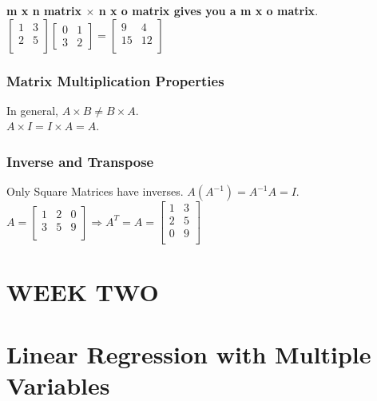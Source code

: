 \documentclass[11pt,a4paper]{article}
\begin{document}
{\bf m x n matrix $\times$ n x o matrix gives you a m x o matrix}.
$ \begin{bmatrix}
 1 & 3 \\ 
2 & 5\\ 
\end{bmatrix} \begin{bmatrix}
0 & 1 \\ 
3 & 2
\end{bmatrix} = 
\begin{bmatrix}
9 & 4\\ 
15&12  \\ 
\end{bmatrix}
$
    \subsubsection{Matrix Multiplication Properties}
    In general, $A \times B \ne B \times A$.\\
    $A \times I =  I \times A = A$.\\

    \subsubsection{Inverse and Transpose}
    Only Square Matrices have inverses. 
    $A (A^{-1})  = A^{-1} A  = I$.\\
    $ 
    A = \begin{bmatrix}
      1 & 2 & 0 \\ 
      3 & 5 & 9 \\ 
    \end{bmatrix} 
    \Rightarrow
    A^T = A = \begin{bmatrix}
      1 & 3  \\ 
      2 & 5  \\ 
      0 & 9\\
    \end{bmatrix} 
    $

\newpage
\section*{WEEK   TWO}

\section{Linear Regression with Multiple Variables}
\end{document}
